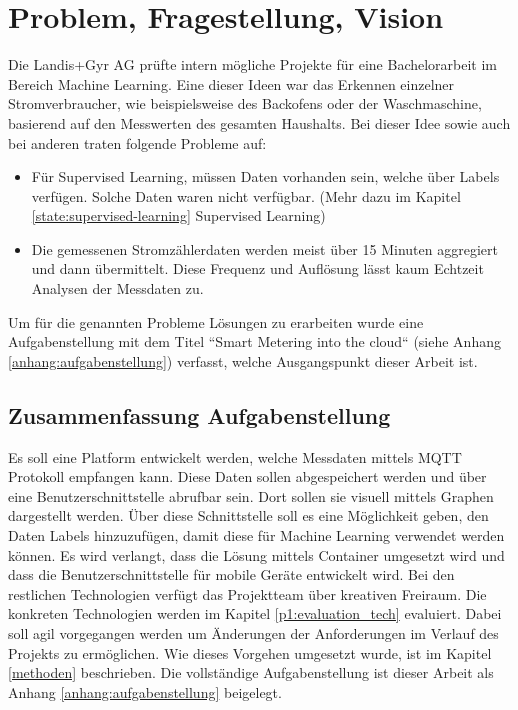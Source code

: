 \chapter{Problem, Fragestellung, Vision}
\label{cap1}
Die Landis+Gyr AG prüfte intern mögliche Projekte für eine Bachelorarbeit im Bereich Machine Learning.
Eine dieser Ideen war das Erkennen einzelner Stromverbraucher, wie beispielsweise des Backofens oder der Waschmaschine,
basierend auf den Messwerten des gesamten Haushalts.
Bei dieser Idee sowie auch bei anderen traten folgende Probleme auf:
\begin{itemize}
      \item Für Supervised Learning, müssen Daten vorhanden sein,
            welche über Labels verfügen. 
            Solche Daten waren nicht verfügbar. (Mehr dazu im Kapitel \ref{state:supervised-learning} Supervised Learning)
      \item Die gemessenen Stromzählerdaten werden meist über 15 Minuten aggregiert und dann übermittelt.
            Diese Frequenz und Auflösung lässt kaum Echtzeit Analysen der Messdaten zu.

\end{itemize}

Um für die genannten Probleme Lösungen zu erarbeiten wurde eine Aufgabenstellung mit dem Titel ``Smart Metering into the cloud`` (siehe Anhang \ref{anhang:aufgabenstellung}) verfasst,
welche Ausgangspunkt dieser Arbeit ist.

\section{Zusammenfassung Aufgabenstellung}
\label{aufgabenstellung}

Es soll eine Platform entwickelt werden, welche Messdaten mittels \ac{MQTT} Protokoll  empfangen kann.
Diese Daten sollen abgespeichert werden und über eine Benutzerschnittstelle abrufbar sein.
Dort sollen sie visuell mittels Graphen dargestellt werden.
Über diese Schnittstelle soll es eine Möglichkeit geben, den Daten Labels hinzuzufügen,
damit diese für Machine Learning verwendet werden können.
Es wird verlangt, dass die Lösung mittels Container umgesetzt wird und dass die Benutzerschnittstelle für mobile Geräte entwickelt wird.
Bei den restlichen Technologien verfügt das Projektteam über kreativen Freiraum.
Die konkreten Technologien werden im Kapitel \ref{p1:evaluation_tech} evaluiert.
Dabei soll agil vorgegangen werden um Änderungen der Anforderungen im Verlauf des Projekts zu ermöglichen.
Wie dieses Vorgehen umgesetzt wurde, ist im Kapitel \ref{methoden} beschrieben.
Die vollständige Aufgabenstellung ist dieser Arbeit als Anhang \ref{anhang:aufgabenstellung} beigelegt.

